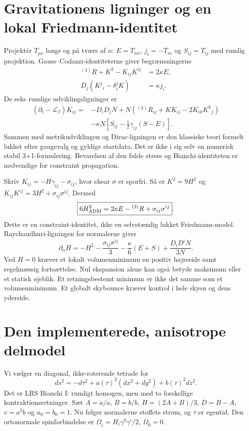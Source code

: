 \documentclass[11pt,a4paper]{article}
\begin{document}
\section{Gravitationens ligninger og en lokal Friedmann-identitet}
Projektér $T_{\mu\nu}$ langs og på tværs af $n$: $E=T_{nn}$, $j_i=-T_{in}$ og $S_{ij}=T_{ij}$ med rumlig projektion. Gauss--Codazzi-identiteterne giver begrænsningerne
\begin{align}
 {}^{(3)}R+K^2-K_{ij}K^{ij}&=2\kappa E,\\
 D_j(K^j{}_i-\delta^j_i K)&=\kappa j_i.
\end{align}
De seks rumlige udviklingsligninger er
\begin{align}
 (\partial_t-\mathcal L_\beta)K_{ij}={}&-D_iD_jN
 +N({}^{(3)}R_{ij}+KK_{ij}-2K_{ik}K^k{}_j)\nonumber\\
 &-\kappa N\left[S_{ij}-\tfrac12\gamma_{ij}(S-E)\right].
\end{align}
Sammen med metrikudviklingen og Dirac-ligningen er den klassiske teori formelt lukket efter gaugevalg og gyldige startdata. Det er ikke i sig selv en numerisk stabil 3+1-formulering. Bevarelsen af den fulde stress og Bianchi-identiteten er nødvendige for constraint propagation.

Skriv $K_{ij}=-H\gamma_{ij}-\sigma_{ij}$, hvor shear $\sigma$ er sporfri. Så er $K^2=9H^2$ og $K_{ij}K^{ij}=3H^2+\sigma_{ij}\sigma^{ij}$. Dermed
\begin{equation}
 \boxed{6H_{\rm ADM}^2=2\kappa E-{}^{(3)}R+\sigma_{ij}\sigma^{ij}}.
\end{equation}
Dette er en constraint-identitet, ikke en selvstændig lukket Friedmann-model. Raychaudhuri-ligningen for normalerne giver
\begin{equation}
 \partial_n H=-H^2-\frac{\sigma_{ij}\sigma^{ij}}3
 -\frac\kappa6(E+S)+\frac{D_iD^iN}{3N}.
\end{equation}
Ved $H=0$ kræver et lokalt volumenminimum en positiv højreside samt regelmæssig fortsættelse. Nul ekspansion alene kan også betyde maksimum eller et statisk øjeblik. Et retningsbestemt minimum er ikke det samme som et volumenminimum. Et globalt skybounce kræver kontrol i hele skyen og dens yderside.

\section{Den implementerede, anisotrope delmodel}
Vi vælger en diagonal, ikke-roterende tetrade for
\begin{equation}
 ds^2=-d\tau^2+a(\tau)^2(dx^2+dy^2)+b(\tau)^2dz^2.
\end{equation}
Det er LRS Bianchi I: rumligt homogen, men med to forskellige kontraktionsretninger. Sæt $A=\dot a/a$, $B=\dot b/b$, $H=(2A+B)/3$, $D=B-A$, $v=a^2b$ og $a_0=b_0=1$. Nu følger normalerne stoffets strøm, og $\tau$ er egentid. Den ortonormale spinforbindelse er $\Omega_{\hat i}=H_i\gamma^0\gamma^i/2$, $\Omega_{\hat0}=0$.
\end{document}
